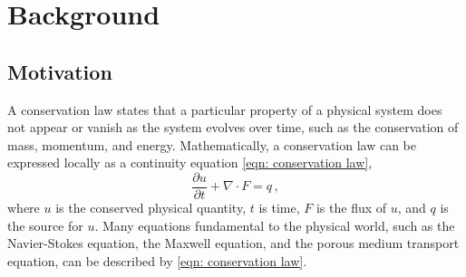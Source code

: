 \chapter{Background}
\label{chap 1}

\section{Motivation}
\label{sec: motivation}
A conservation law states that a particular property of a physical system does not
appear or vanish as the system evolves over time, such as the conservation of mass, momentum, and energy. 
Mathematically, a conservation law can be expressed locally as a continuity equation
\eqref{eqn: conservation law},
\begin{equation}
    \frac{\partial u}{\partial t} + \nabla \cdot F = q\,,
    \label{eqn: conservation law}
\end{equation}
where $u$ is the conserved physical quantity, $t$ is time, $F$ is the flux of $u$, and $q$
is the source for $u$. Many equations fundamental to the physical world, such as the Navier-Stokes equation,
the Maxwell equation, and the porous medium transport equation, can be described by \eqref{eqn: conservation law}.\\

